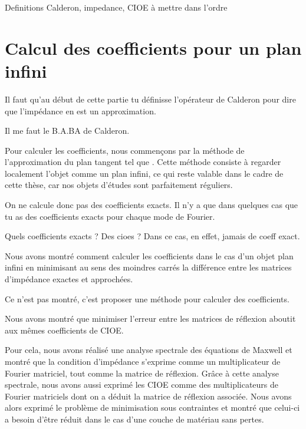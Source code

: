 \begin{REM}
  Definitions Calderon, impedance, CIOE à mettre dans l'ordre
\end{REM}

\chapter{Calcul des coefficients pour un plan infini}
\label{sec:plan}
\minitoc
\newpage
\begin{REM}
  Il faut qu'au début de cette partie tu définisse l’opérateur de Calderon pour dire que l’impédance en est un approximation.
\end{REM}
\begin{REP}
    Il me faut le B.A.BA de Calderon.
\end{REP}
Pour calculer les coefficients, nous commençons par la méthode de l'approximation du plan tangent tel que \cite{hoppe_impedance_1995,marceaux_high-order_2000,aubakirov_electromagnetic_2014}. Cette méthode consiste à regarder localement l'objet comme un plan infini, ce qui reste valable dans le cadre de cette thèse, car nos objets d'études sont parfaitement réguliers.
\begin{REM}
    On ne calcule donc pas des coefficients exacts. Il n'y a que dans quelques cas que tu as des coefficients exacts pour chaque mode de Fourier.
\end{REM}
\begin{REP}
    Quels coefficients exacts ? Des cioes ? Dans ce cas, en effet, jamais de coeff exact.
\end{REP}







Nous avons montré comment calculer les coefficients dans le cas d'un objet plan infini en minimisant au sens des moindres carrés la différence entre les matrices d'impédance exactes et approchées.
\begin{REM}
    Ce n'est pas montré, c'est proposer une méthode pour calculer des coefficients.
\end{REM}
Nous avons montré que minimiser l'erreur entre les matrices de réflexion aboutit aux mêmes coefficients de CIOE.

Pour cela, nous avons réalisé une analyse spectrale des équations de Maxwell et montré que la condition d'impédance s'exprime comme un multiplicateur de Fourier matriciel, tout comme la matrice de réflexion. Grâce à cette analyse spectrale, nous avons aussi exprimé les CIOE comme des multiplicateurs de Fourier matriciels dont on a déduit la matrice de réflexion associée. Nous avons alors exprimé le problème de minimisation sous contraintes et montré que celui-ci a besoin d'être réduit dans le cas d'une couche de matériau sans pertes.

